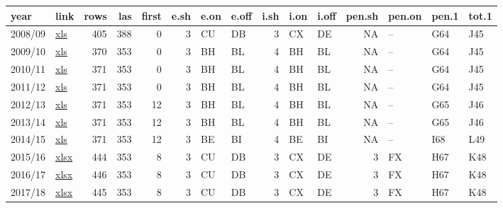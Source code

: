\documentclass[]{article}
\begin{document}
\begin{tabular}{llrrrrllrllrlll}
\toprule
year & link & rows & las & first & e.sh & e.on & e.off & i.sh & i.on & i.off & pen.sh & pen.on & pen.1 & tot.1\\
\midrule
2008/09 & \href{https://www.gov.uk/government/uploads/system/uploads/attachment_data/file/397002/Revenue_Outturn__RO2__data_2008-09_by_LA_-_Revised_17-Nov-2011.xls}{xls} & 405 & 388 & 0 & 3 & CU & DB & 3 & CX & DE & NA & -- & G64 & J45\\
\cmidrule{1-15}
2009/10 & \href{https://www.gov.uk/government/uploads/system/uploads/attachment_data/file/387065/RO2.xls}{xls} & 370 & 353 & 0 & 3 & BH & BL & 4 & BH & BL & NA & -- & G64 & J45\\
\cmidrule{1-15}
2010/11 & \href{https://www.gov.uk/government/uploads/system/uploads/attachment_data/file/16448/Revenue_Outturn__RO2__data_2010-11_by_LA_-_27-Nov-2012-v2.xls}{xls} & 371 & 353 & 0 & 3 & BH & BL & 4 & BH & BL & NA & -- & G64 & J45\\
\cmidrule{1-15}
2011/12 & \href{https://www.gov.uk/government/uploads/system/uploads/attachment_data/file/262061/Revenue_Outturn__RO2__data_2011-12_by_LA_-_Revised_28-Nov-2013.xls}{xls} & 371 & 353 & 0 & 3 & BH & BL & 4 & BH & BL & NA & -- & G64 & J45\\
\cmidrule{1-15}
2012/13 & \href{https://www.gov.uk/government/uploads/system/uploads/attachment_data/file/282558/Revenue_Outturn__RO2__data_2012-13_by_LA__Revised__-_18-Feb-2014.xls}{xls} & 371 & 353 & 12 & 3 & BH & BL & 4 & BH & BL & NA & -- & G65 & J46\\
\cmidrule{1-15}
2013/14 & \href{https://www.gov.uk/government/uploads/system/uploads/attachment_data/file/381066/Revenue_Outturn__RO2__data_2013-14_by_LA.xls}{xls} & 371 & 353 & 12 & 3 & BH & BL & 4 & BH & BL & NA & -- & G65 & J46\\
\cmidrule{1-15}
2014/15 & \href{https://www.gov.uk/government/uploads/system/uploads/attachment_data/file/497099/Revenue_Outturn__RO2__data_2014-15_by_LA_-_02-Feb-2016.xls}{xls} & 371 & 353 & 12 & 3 & BE & BI & 4 & BE & BI & NA & -- & I68 & L49\\
\cmidrule{1-15}
2015/16 & \href{https://www.gov.uk/government/uploads/system/uploads/attachment_data/file/659790/RO2_2015-16_data_by_LA_-_Revision.xlsx}{xlsx} & 444 & 353 & 8 & 3 & CU & DB & 3 & CX & DE & 3 & FX & H67 & K48\\
\cmidrule{1-15}
2016/17 & \href{https://www.gov.uk/government/uploads/system/uploads/attachment_data/file/659775/RO2_2016-17_data_by_LA.xlsx}{xlsx} & 446 & 353 & 8 & 3 & CU & DB & 3 & CX & DE & 3 & FX & H67 & K48\\
\cmidrule{1-15}
2017/18 & \href{https://assets.publishing.service.gov.uk/government/uploads/system/uploads/attachment_data/file/757366/RO2_2017-18_data_by_LA.xlsx}{xlsx} & 445 & 353 & 8 & 3 & CU & DB & 3 & CX & DE & 3 & FX & H67 & K48\\
\bottomrule
\end{tabular}
\end{document}
